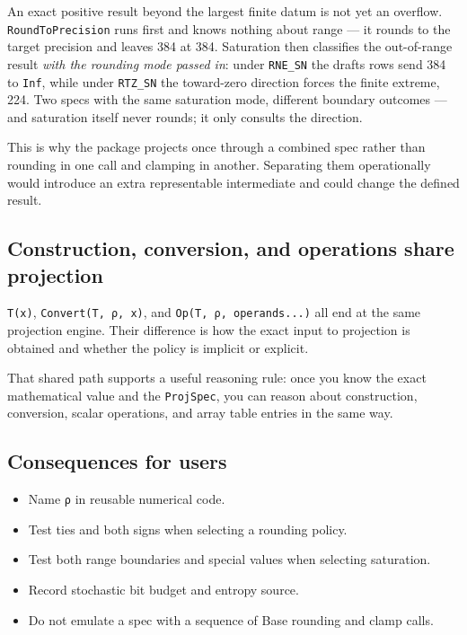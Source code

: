 \label{16089341130616865761}{}


An exact positive result beyond the largest finite datum is not yet an overflow. \texttt{RoundToPrecision} runs first and knows nothing about range — it rounds to the target precision and leaves 384 at 384. Saturation then classifies the out-of-range result \emph{with the rounding mode passed in}: under \texttt{RNE\_\allowbreak{}SN} the draft{\textquotesingle}s rows send 384 to \texttt{Inf}, while under \texttt{RTZ\_\allowbreak{}SN} the toward-zero direction forces the finite extreme, 224. Two specs with the same saturation mode, different boundary outcomes — and saturation itself never rounds; it only consults the direction.



This is why the package projects once through a combined spec rather than rounding in one call and clamping in another. Separating them operationally would introduce an extra representable intermediate and could change the defined result.



\subsection{Construction, conversion, and operations share projection}



\label{6234549246197811811}{}


\texttt{T(x)}, \texttt{Convert(T, ρ, x)}, and \texttt{Op(T, ρ, operands...)} all end at the same projection engine. Their difference is how the exact input to projection is obtained and whether the policy is implicit or explicit.



That shared path supports a useful reasoning rule: once you know the exact mathematical value and the \texttt{ProjSpec}, you can reason about construction, conversion, scalar operations, and array table entries in the same way.



\subsection{Consequences for users}



\label{13317231500647269880}{}


\begin{itemize}
\item Name \texttt{ρ} in reusable numerical code.


\item Test ties and both signs when selecting a rounding policy.


\item Test both range boundaries and special values when selecting saturation.


\item Record stochastic bit budget and entropy source.


\item Do not emulate a spec with a sequence of Base rounding and clamp calls.

\end{itemize}


